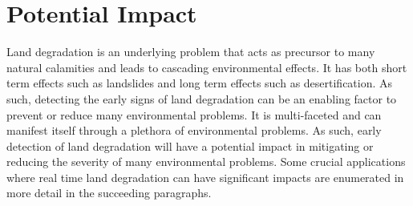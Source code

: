 \documentclass[11pt,letterpaper]{article}
\theoremstyle{plain}
\theoremstyle{definition}
\theoremstyle{remark}
\begin{document}
\section{Potential Impact}

Land degradation is an underlying problem that acts as precursor to many natural calamities and leads to cascading environmental effects. It has both short term effects such as landslides and long term effects such as desertification. As such, detecting the early signs of land degradation can be an enabling factor to prevent or reduce many environmental problems. It is multi-faceted and can manifest itself through a plethora of environmental problems. As such, early detection of land degradation will have a potential impact in mitigating or reducing the severity of many environmental problems. Some crucial applications where real time land degradation can have significant impacts are enumerated in more detail in the succeeding paragraphs.
\end{document}

